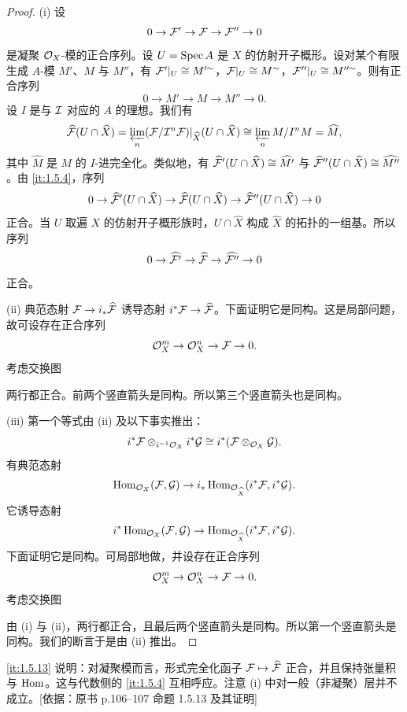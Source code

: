 \begin{proof}
(i) 设
\[
0\to\mathcal{F}'\to\mathcal{F}\to\mathcal{F}''\to 0
\]
是凝聚 $\mathcal{O}_X$-模的正合序列。设 $U=\operatorname{Spec} A$ 是 $X$ 的仿射开子概形。设对某个有限生成 $A$-模 $M'$、$M$ 与 $M''$，有 $\mathcal{F}'|_U\cong M'^{\sim}$，$\mathcal{F}|_U\cong M^{\sim}$，$\mathcal{F}''|_U\cong M''^{\sim}$。则有正合序列
\[
0\to M'\to M\to M''\to 0.
\]
设 $I$ 是与 $\mathcal{I}$ 对应的 $A$ 的理想。我们有
\[
\widehat{\mathcal{F}}(U\cap\widehat X)=\varprojlim_n(\mathcal{F}/\mathcal{I}^n\mathcal{F})|_{\widehat X}(U\cap\widehat X)\cong\varprojlim_n M/I^nM=\widehat M,
\]
其中 $\widehat M$ 是 $M$ 的 $I$-进完全化。类似地，有 $\widehat{\mathcal{F}}'(U\cap\widehat X)\cong\widehat{M'}$ 与 $\widehat{\mathcal{F}}''(U\cap\widehat X)\cong\widehat{M''}$。由 \ref{it:1.5.4}，序列
\[
0\to\widehat{\mathcal{F}}'(U\cap\widehat X)\to\widehat{\mathcal{F}}(U\cap\widehat X)\to\widehat{\mathcal{F}}''(U\cap\widehat X)\to 0
\]
正合。当 $U$ 取遍 $X$ 的仿射开子概形族时，$U\cap\widehat X$ 构成 $\widehat X$ 的拓扑的一组基。所以序列
\[
0\to\widehat{\mathcal{F}'}\to\widehat{\mathcal{F}}\to\widehat{\mathcal{F}''}\to 0
\]
正合。

(ii) 典范态射 $\mathcal{F}\to i_*\widehat{\mathcal{F}}$ 诱导态射 $i^*\mathcal{F}\to\widehat{\mathcal{F}}$。下面证明它是同构。这是局部问题，故可设存在正合序列
\[
\mathcal{O}_X^m\to\mathcal{O}_X^n\to\mathcal{F}\to 0.
\]
考虑交换图
\begin{center}
\end{center}
两行都正合。前两个竖直箭头是同构。所以第三个竖直箭头也是同构。

(iii) 第一个等式由 (ii) 及以下事实推出：
\[
i^*\mathcal{F}\otimes_{i^{-1}\mathcal{O}_X}i^*\mathcal{G}\cong i^*(\mathcal{F}\otimes_{\mathcal{O}_X}\mathcal{G}).
\]
有典范态射
\[
\operatorname{Hom}_{\mathcal{O}_X}(\mathcal{F},\mathcal{G})\to i_*\operatorname{Hom}_{\mathcal{O}_{\widehat X}}(i^*\mathcal{F},i^*\mathcal{G}).
\]
它诱导态射
\[
i^*\operatorname{Hom}_{\mathcal{O}_X}(\mathcal{F},\mathcal{G})\to\operatorname{Hom}_{\mathcal{O}_{\widehat X}}(i^*\mathcal{F},i^*\mathcal{G}).
\]
下面证明它是同构。可局部地做，并设存在正合序列
\[
\mathcal{O}_X^m\to\mathcal{O}_X^n\to\mathcal{F}\to 0.
\]
考虑交换图
\begin{center}
\end{center}
由 (i) 与 (ii)，两行都正合，且最后两个竖直箭头是同构。所以第一个竖直箭头是同构。我们的断言于是由 (ii) 推出。
\end{proof}
\begin{tnote}
\ref{it:1.5.13} 说明：对凝聚模而言，形式完全化函子 $\mathcal{F}\mapsto\widehat{\mathcal{F}}$ 正合，并且保持张量积与 $\operatorname{Hom}$。这与代数侧的 \ref{it:1.5.4} 互相呼应。注意 (i) 中对一般（非凝聚）层并不成立。[依据：原书 p.106–107 命题 1.5.13 及其证明]
\end{tnote}

